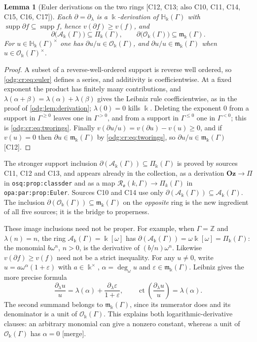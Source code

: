 \documentclass[11pt,oneside]{article}
\numberwithin{equation}{section}
\newtheorem{lemma}[lemma]{Lemma}
\theoremstyle{definition}
\theoremstyle{remark}
\newcommand{\Oz}{\mathbf{Oz}}
\newcommand{\Z}{\mathbb Z}
\newcommand{\ct}{\operatorname{ct}}
\newcommand{\supp}{\operatorname{supp}}
\newcommand{\ddeg}{\operatorname{deg}_{\omega}}
\newcommand{\src}[1]{\textup{\textsf{\small[#1]}}}
\newcommand{\mergetag}{\textup{\textsf{\small[merge]}}}
\newcommand{\replabel}[1]{\nolinkurl{#1}}
\newcommand{\crH}{\mathbb H_\Bbbk(\Gamma)}
\newcommand{\crA}{\mathcal A_\Bbbk(\Gamma)}
\newcommand{\crP}{\Pi_\Bbbk(\Gamma)}
\newcommand{\crO}{\mathcal O_\Bbbk(\Gamma)}
\newcommand{\crm}{\mathfrak m_\Bbbk(\Gamma)}
\begin{document}
\begin{lemma}[Euler derivations on the two rings \src{C12, C13; also C10, C11, C14, C15, C16, C17}]\label{odg:cr:lem:euler}
Each $\partial=\partial_\lambda$ is a $\Bbbk$-derivation of $\crH$ with
$\supp\partial f\subseteq\supp f$, hence $v(\partial f)\ge v(f)$, and
\begin{equation}\label{odg:cr:eq:tworings}
 \partial\bigl(\crA\bigr)\subseteq\crP,\qquad
 \partial\bigl(\crO\bigr)\subseteq\crm .
\end{equation}
For $u\in\crH^\times$ one has $\partial u/u\in\crO$, and $\partial u/u\in\crm$
when $u\in\crO^\times$.
\end{lemma}
\begin{proof}
A subset of a reverse-well-ordered support is reverse well ordered, so
\eqref{odg:cr:eq:euler} defines a series, and additivity is coefficientwise. At a
fixed exponent the product has finitely many contributions, and
$\lambda(\alpha+\beta)=\lambda(\alpha)+\lambda(\beta)$ gives the Leibniz rule
coefficientwise, as in the proof of \cref{odg:lem:derivation}; $\lambda(0)=0$
kills $\Bbbk$. Deleting the exponent $0$ from a support in $\Gamma^{\ge0}$ leaves one
in $\Gamma^{>0}$, and from a support in $\Gamma^{\le0}$ one in $\Gamma^{<0}$; this is
\eqref{odg:cr:eq:tworings}. Finally $v(\partial u/u)=v(\partial u)-v(u)\ge0$, and if
$v(u)=0$ then $\partial u\in\crm$ by \eqref{odg:cr:eq:tworings}, so
$\partial u/u\in\crm$ \src{C12}.
\end{proof}

The stronger support inclusion $\partial(\crA)\subseteq\crP$ is proved by sources C11, C12
and C13, and appears already in the collection, as a derivation
$\Oz\to\Pi$ in \replabel{osq:prop:classder} and as a map
$\mathcal R_{\mathfrak o}(k,\Gamma)\to\Pi_k(\Gamma)$ in \replabel{opa:par:prop:Euler}.
Sources C10 and C14 use only $\partial(\crA)\subseteq\crA$. The inclusion
$\partial(\crO)\subseteq\crm$ on the \emph{opposite} ring is the new ingredient of
all five sources; it is the bridge to properness.

These image inclusions need not be proper. For example, when $\Gamma=\Z$
and $\lambda(n)=n$, the ring $\crA=\Bbbk[\omega]$ has
$\partial(\crA)=\omega\Bbbk[\omega]=\crP$: the monomial
$b\omega^n$, $n>0$, is the derivative of $(b/n)\omega^n$.
Likewise $v(\partial f)\ge v(f)$ need not be a strict inequality.
For any $u\ne0$, write $u=a\omega^\alpha(1+\varepsilon)$ with
$a\in\Bbbk^\times$, $\alpha=\ddeg u$ and $\varepsilon\in\crm$.
Leibniz gives the more precise formula
\[
 \frac{\partial_\lambda u}{u}
 =\lambda(\alpha)+\frac{\partial_\lambda\varepsilon}{1+\varepsilon},
 \qquad
 \ct\!\left(\frac{\partial_\lambda u}{u}\right)=\lambda(\alpha).
\]
The second summand belongs to $\crm$, since its numerator does and its
denominator is a unit of $\crO$. This explains both logarithmic-derivative
clauses: an arbitrary monomial can give a nonzero constant, whereas a
unit of $\crO$ has $\alpha=0$ \mergetag.
\end{document}
